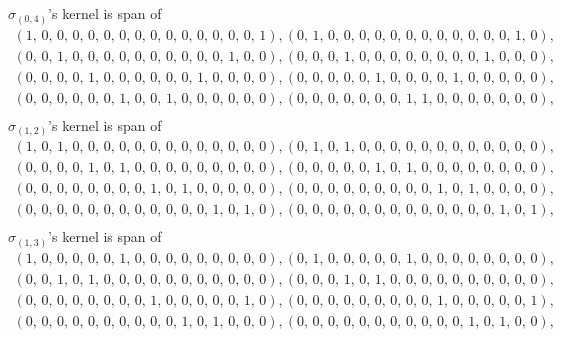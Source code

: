 \documentclass[8pt]{article}\usepackage{amsmath}
\begin{document}
\( \sigma_{(0, 4)}\)'s kernel is span of   
\begin{align*} \left(1,\,0,\,0,\,0,\,0,\,0,\,0,\,0,\,0,\,0,\,0,\,0,\,0,\,0,\,0,\,1\right) , \left(0,\,1,\,0,\,0,\,0,\,0,\,0,\,0,\,0,\,0,\,0,\,0,\,0,\,0,\,1,\,0\right) , \\ 
 \left(0,\,0,\,1,\,0,\,0,\,0,\,0,\,0,\,0,\,0,\,0,\,0,\,0,\,1,\,0,\,0\right) , \left(0,\,0,\,0,\,1,\,0,\,0,\,0,\,0,\,0,\,0,\,0,\,0,\,1,\,0,\,0,\,0\right) , \\ 
 \left(0,\,0,\,0,\,0,\,1,\,0,\,0,\,0,\,0,\,0,\,0,\,1,\,0,\,0,\,0,\,0\right) , \left(0,\,0,\,0,\,0,\,0,\,1,\,0,\,0,\,0,\,0,\,1,\,0,\,0,\,0,\,0,\,0\right) , \\ 
 \left(0,\,0,\,0,\,0,\,0,\,0,\,1,\,0,\,0,\,1,\,0,\,0,\,0,\,0,\,0,\,0\right) , \left(0,\,0,\,0,\,0,\,0,\,0,\,0,\,1,\,1,\,0,\,0,\,0,\,0,\,0,\,0,\,0\right) , \\ \end{align*}
\( \sigma_{(1, 2)}\)'s kernel is span of   
\begin{align*} \left(1,\,0,\,1,\,0,\,0,\,0,\,0,\,0,\,0,\,0,\,0,\,0,\,0,\,0,\,0,\,0\right) , \left(0,\,1,\,0,\,1,\,0,\,0,\,0,\,0,\,0,\,0,\,0,\,0,\,0,\,0,\,0,\,0\right) , \\ 
 \left(0,\,0,\,0,\,0,\,1,\,0,\,1,\,0,\,0,\,0,\,0,\,0,\,0,\,0,\,0,\,0\right) , \left(0,\,0,\,0,\,0,\,0,\,1,\,0,\,1,\,0,\,0,\,0,\,0,\,0,\,0,\,0,\,0\right) , \\ 
 \left(0,\,0,\,0,\,0,\,0,\,0,\,0,\,0,\,1,\,0,\,1,\,0,\,0,\,0,\,0,\,0\right) , \left(0,\,0,\,0,\,0,\,0,\,0,\,0,\,0,\,0,\,1,\,0,\,1,\,0,\,0,\,0,\,0\right) , \\ 
 \left(0,\,0,\,0,\,0,\,0,\,0,\,0,\,0,\,0,\,0,\,0,\,0,\,1,\,0,\,1,\,0\right) , \left(0,\,0,\,0,\,0,\,0,\,0,\,0,\,0,\,0,\,0,\,0,\,0,\,0,\,1,\,0,\,1\right) , \\ \end{align*}
\( \sigma_{(1, 3)}\)'s kernel is span of   
\begin{align*} \left(1,\,0,\,0,\,0,\,0,\,0,\,1,\,0,\,0,\,0,\,0,\,0,\,0,\,0,\,0,\,0\right) , \left(0,\,1,\,0,\,0,\,0,\,0,\,0,\,1,\,0,\,0,\,0,\,0,\,0,\,0,\,0,\,0\right) , \\ 
 \left(0,\,0,\,1,\,0,\,1,\,0,\,0,\,0,\,0,\,0,\,0,\,0,\,0,\,0,\,0,\,0\right) , \left(0,\,0,\,0,\,1,\,0,\,1,\,0,\,0,\,0,\,0,\,0,\,0,\,0,\,0,\,0,\,0\right) , \\ 
 \left(0,\,0,\,0,\,0,\,0,\,0,\,0,\,0,\,1,\,0,\,0,\,0,\,0,\,0,\,1,\,0\right) , \left(0,\,0,\,0,\,0,\,0,\,0,\,0,\,0,\,0,\,1,\,0,\,0,\,0,\,0,\,0,\,1\right) , \\ 
 \left(0,\,0,\,0,\,0,\,0,\,0,\,0,\,0,\,0,\,0,\,1,\,0,\,1,\,0,\,0,\,0\right) , \left(0,\,0,\,0,\,0,\,0,\,0,\,0,\,0,\,0,\,0,\,0,\,1,\,0,\,1,\,0,\,0\right) , \\ \end{align*}
\end{document}
